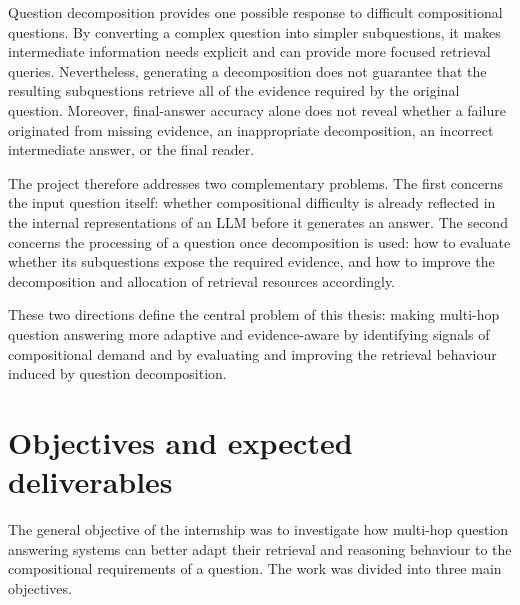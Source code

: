 Question decomposition provides one possible response to difficult
compositional questions. By converting a complex question into simpler
subquestions, it makes intermediate information needs explicit and can provide
more focused retrieval queries. Nevertheless, generating a decomposition does
not guarantee that the resulting subquestions retrieve all of the evidence
required by the original question. Moreover, final-answer accuracy alone does
not reveal whether a failure originated from missing evidence, an inappropriate
decomposition, an incorrect intermediate answer, or the final reader.

The project therefore addresses two complementary problems. The first concerns
the input question itself: whether compositional difficulty is already reflected
in the internal representations of an LLM before it generates an answer. The
second concerns the processing of a question once decomposition is used: how to
evaluate whether its subquestions expose the required evidence, and how to
improve the decomposition and allocation of retrieval resources accordingly.

These two directions define the central problem of this thesis: making
multi-hop question answering more adaptive and evidence-aware by identifying
signals of compositional demand and by evaluating and improving the retrieval
behaviour induced by question decomposition.



\section{Objectives and expected deliverables}
\label{sec:ch1-objectives}


The general objective of the internship was to investigate how multi-hop
question answering systems can better adapt their retrieval and reasoning
behaviour to the compositional requirements of a question. The work was divided
into three main objectives.

